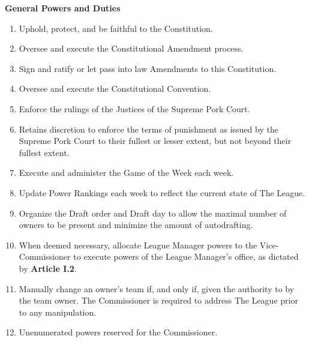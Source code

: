 \documentclass{article}
\begin{document}
    \noindent\textbf{General Powers and Duties}
    \begin{enumerate}[label=\Alph*)]
        \item Uphold, protect, and be faithful to the Constitution.
        \item Oversee and execute the Constitutional Amendment process.
        \item Sign and ratify or let pass into law Amendments to this Constitution.
        \item Oversee and execute the Constitutional Convention.
        \item Enforce the rulings of the Justices of the Supreme Pork Court.
        \item Retains discretion to enforce the terms of punishment as issued by the Supreme Pork Court to their fullest or lesser extent, but not beyond their fullest extent.
        \item Execute and administer the Game of the Week each week.
        \item Update Power Rankings each week to reflect the current state of The League.
        \item Organize the Draft order and Draft day to allow the maximal number of owners to be present and minimize the amount of autodrafting.
        \item When deemed necessary, allocate League Manager powers to the Vice-Commissioner to execute powers of the League Manager’s office, as dictated by \textbf{Article I.2}.
        \item Manually change an owner’s team if, and only if, given the authority to by the team owner. The Commissioner is required to address The League prior to any manipulation.
        \item Unenumerated powers reserved for the Commissioner.
    \end{enumerate}
\end{document}
